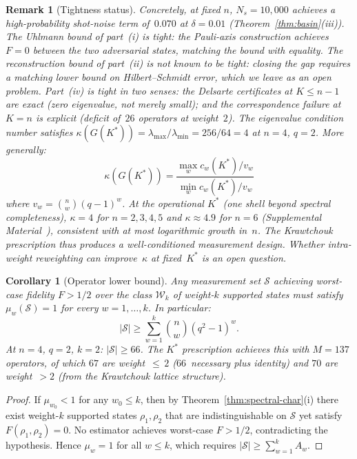 \documentclass[twocolumn,prx,aps,superscriptaddress,longbibliography,floatfix]{revtex4-2}
\newtheorem{corollary}[theorem]{Corollary}
\newtheorem*{remark}{Remark}
\newcommand{\pclaim}[4]{}
\begin{document}
\begin{remark}[Tightness status]
Concretely, at fixed $n$, $N_s = 10{,}000$ achieves a
high-probability shot-noise term of~$0.070$
at $\delta = 0.01$ (Theorem~\ref{thm:basin}(iii)).
The Uhlmann bound of part~(i) is \emph{tight}: the
Pauli-axis construction achieves $F = 0$ between the
two adversarial states, matching the bound with equality.
The reconstruction bound of part~(ii) is \emph{not known to be
tight}: closing the gap requires a matching lower bound
on Hilbert--Schmidt error, which we leave as an open problem.
Part~(iv) is tight in two senses:
the Delsarte certificates at $K \le n{-}1$ are exact
(zero eigenvalue, not merely small);
and the correspondence failure at $K = n$ is explicit
(deficit of~$26$ operators at weight~$2$).
The eigenvalue condition number satisfies
$\kappa(G(K^*)) = \lambda_{\max}/\lambda_{\min}
= 256/64 = 4$ at $n = 4$, $q = 2$.
More generally:
\begin{equation}\label{eq:kappa}
  \kappa(G(K^*)) = \frac{\max_w c_w(K^*)/v_w}
  {\min_w c_w(K^*)/v_w}
\end{equation}
where $v_w = \binom{n}{w}(q{-}1)^w$.
At the operational $K^*$ (one shell beyond spectral
completeness), $\kappa = 4$ for $n = 2, 3, 4, 5$
and $\kappa \approx 4.9$ for $n = 6$
(Supplemental Material~\cite{supplemental}),
consistent with at most logarithmic growth in~$n$.
The Krawtchouk prescription thus produces a
well-conditioned measurement design.
Whether intra-weight reweighting can
improve~$\kappa$ at fixed~$K^*$ is an open question.
\end{remark}

\pclaim{env:cor:lower_bound}{proved}{q>=2}{cor:lower_bound}%
\begin{corollary}[Operator lower bound]
\label{cor:lower_bound}
Any measurement set $\mathcal{S}$ achieving worst-case fidelity
$F > 1/2$ over the class $\mathcal{W}_k$ of weight-$k$ supported states
must satisfy $\mu_w(\mathcal{S}) = 1$ for every $w = 1,\ldots,k$.
In particular:
\begin{equation}\label{eq:lower_bound}
  |\mathcal{S}| \ge
  \sum_{w=1}^{k}\binom{n}{w}(q^2 - 1)^w.
\end{equation}
At $n = 4$, $q = 2$, $k = 2$: $|\mathcal{S}| \ge 66$.
The $K^*$ prescription achieves this with $M = 137$ operators, of
which $67$ are weight~${\le}\,2$ ($66$~necessary plus identity) and
$70$ are weight~$> 2$ (from the Krawtchouk lattice structure).
\end{corollary}
\begin{proof}
If $\mu_{w_0} < 1$ for any $w_0 \le k$, then by
Theorem~\ref{thm:spectral-char}(i) there exist weight-$k$ supported
states $\rho_1, \rho_2$ that are indistinguishable on
$\mathcal{S}$ yet satisfy $F(\rho_1, \rho_2) = 0$.
No estimator achieves worst-case $F > 1/2$,
contradicting the hypothesis.  Hence $\mu_w = 1$ for all
$w \le k$, which requires $|\mathcal{S}|
\ge \sum_{w=1}^{k} A_w$.
\end{proof}
\end{document}

